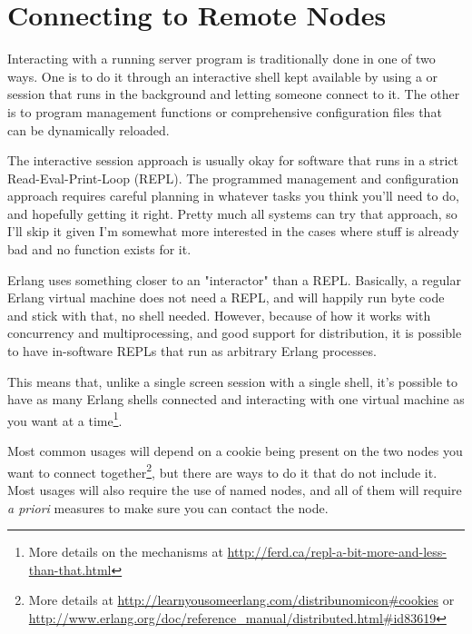 \chapter{Connecting to Remote Nodes}
\label{chap:connecting}

Interacting with a running server program is traditionally done in one of two ways. One is to do it through an interactive shell kept available by using a  or  session that runs in the background and letting someone connect to it. The other is to program management functions or comprehensive configuration files that can be dynamically reloaded.

The interactive session approach is usually okay for software that runs in a strict Read-Eval-Print-Loop (REPL). The programmed management and configuration approach requires careful planning in whatever tasks you think you'll need to do, and hopefully getting it right. Pretty much all systems can try that approach, so I'll skip it given I'm somewhat more interested in the cases where stuff is already bad and no function exists for it.

Erlang uses something closer to an "interactor" than a REPL. Basically, a regular Erlang virtual machine does not need a REPL, and will happily run byte code and stick with that, no shell needed. However, because of how it works with concurrency and multiprocessing, and good support for distribution, it is possible to have in-software REPLs that run as arbitrary Erlang processes.

This means that, unlike a single screen session with a single shell, it's possible to have as many Erlang shells connected and interacting with one virtual machine as you want at a time\footnote{More details on the mechanisms at \href{http://ferd.ca/repl-a-bit-more-and-less-than-that.html}{http://ferd.ca/repl-a-bit-more-and-less-than-that.html}}.

Most common usages will depend on a cookie being present on the two nodes you want to connect together\footnote{More details at \href{http://learnyousomeerlang.com/distribunomicon\#cookies}{http://learnyousomeerlang.com/distribunomicon\#cookies} or \href{http://www.erlang.org/doc/reference\_manual/distributed.html\#id83619}{http://www.erlang.org/doc/reference\_manual/distributed.html\#id83619}}, but there are ways to do it that do not include it. Most usages will also require the use of named nodes, and all of them will require \emph{a priori} measures to make sure you can contact the node.

